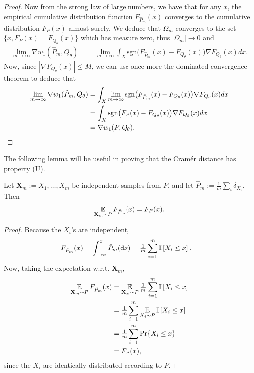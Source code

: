 \documentclass{article}
\newcommand{\beqan}{\begin{eqnarray*}}
\newcommand{\eeqan}{\end{eqnarray*}}
\def \dx {\textrm{d} x}
\def \sgn {\text{sgn}}
\def \batch {\mathbf{X}_m}
\begin{document}
\begin{proof}
Now from the strong law of large numbers, we have that for any $x$, the empirical cumulative distribution function $F_{\hat P_m}(x)$ converges to the cumulative distribution $F_{P}(x)$ almost surely. We deduce that $\Omega_m$ converges to the set $\big\{x, F_{P}(x)=F_{Q_\theta}(x)\big\}$ which has measure zero, thus $|\Omega_m |\rightarrow 0$ and
\beqan
\lim_{m\rightarrow\infty} \nabla w_1(\hat P_m,Q_\theta)&=&\lim_{m\rightarrow\infty} \int_{X} \sgn\big( F_{\hat P_m}(x)-F_{Q_\theta}(x)\big) \nabla F_{Q_\theta}(x) dx.
\eeqan
Now, since $|\nabla F_{Q_\theta}(x)|\leq M$, we can use once more the dominated convergence theorem to deduce that
\begin{align*}
\lim_{m\rightarrow\infty} \nabla w_1(\hat P_m,Q_\theta) &=
\int_{X} \lim_{m\rightarrow\infty} \sgn\big( F_{\hat P_m}(x)-F_{Q_\theta}(x)\big) \nabla F_{Q_\theta}(x) dx\\
&= \int_{X} \sgn\big( F_{P}(x)-F_{Q_\theta}(x)\big) \nabla F_{Q_\theta}(x) dx\\
&= \nabla w_1(P,Q_\theta). \qedhere
\end{align*}
\end{proof}


The following lemma will be useful in proving that the Cram\'er distance has property (U).
\begin{lem}\label{lem:expected_empirical_cdf}
Let $\batch := X_1, \dots, X_m$ be independent samples from $P$, and let $\hat P_m := \tfrac{1}{m} \sum\nolimits_i \delta_{X_i}$. Then
\begin{equation*}
\expect_{\batch \sim P} F_{\hat P_m}(x) = F_P(x) .
\end{equation*}
\end{lem}

\begin{proof}
Because the $X_i$'s are independent,
\begin{align*}
F_{\hat P_m}(x) &= \int^x_{-\infty} \hat P_m(\dx) = \tfrac{1}{m} \sum_{i=1}^m \indic{X_i \le x} .
\end{align*}
Now, taking the expectation w.r.t. $\batch$,
\begin{align*}
\expect_{\batch \sim P} F_{\hat P_m}(x) &= \expect_{\batch \sim P} \tfrac{1}{m} \sum_{i=1}^m \indic{X_i \le x} \\
&= \tfrac{1}{m} \sum_{i=1}^m \expect_{X_i \sim P} \indic{X_i \le x} \\
&= \tfrac{1}{m} \sum_{i=1}^m \Pr \{ X_i \le x \} \\
&= F_P(x),
\end{align*}
since the $X_i$ are identically distributed according to $P$.
\end{proof}
\end{document}
